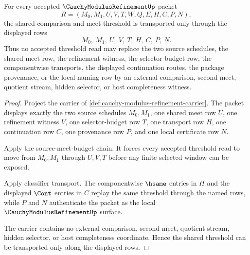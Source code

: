 \begin{theorem}
\label{thm:cauchy-modulus-refinement-shared-threshold-transport}
For every accepted $\CauchyModulusRefinementUp$ packet
$$
R=(M_0,M_1,U,V,T,W,Q,E,H,C,P,N),
$$
the shared comparison and meet threshold is transported only through the displayed rows
$$
M_0,\ M_1,\ U,\ V,\ T,\ H,\ C,\ P,\ N.
$$
Thus no accepted threshold read may replace the two source schedules, the shared meet row, the refinement witness, the selector-budget row, the componentwise transports, the displayed continuation routes, the package provenance, or the local naming row by an external comparison, second meet, quotient stream, hidden selector, or host completeness witness.
\end{theorem}
\begin{proof}
Project the carrier of \autoref{def:cauchy-modulus-refinement-carrier}. The packet displays exactly the two source schedules $M_0,M_1$, one shared meet row $U$, one refinement witness $V$, one selector-budget row $T$, one transport row $H$, one continuation row $C$, one provenance row $P$, and one local certificate row $N$.

Apply the source-meet-budget chain. It forces every accepted threshold read to move from $M_0,M_1$ through $U,V,T$ before any finite selected window can be exposed.

Apply classifier transport. The componentwise $\hsame$ entries in $H$ and the displayed $\Cont$ entries in $C$ replay the same threshold through the named rows, while $P$ and $N$ authenticate the packet as the local $\CauchyModulusRefinementUp$ surface.

The carrier contains no external comparison, second meet, quotient stream, hidden selector, or host completeness coordinate. Hence the shared threshold can be transported only along the displayed rows.
\end{proof}

